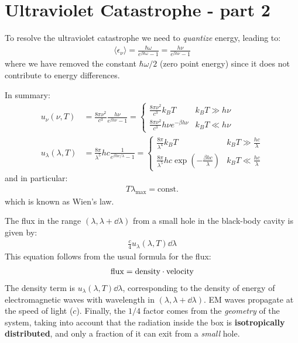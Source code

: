 \documentclass[../../main.tex]{subfiles}
\begin{document}
\section{Ultraviolet Catastrophe - part 2}
To resolve the ultraviolet catastrophe we need to \textit{quantize} energy, leading to:
\begin{align*}
    \langle \epsilon_\nu \rangle = \frac{\hbar \omega}{e^{\beta \hbar \omega} - 1} = \frac{h \nu}{e^{\beta h \nu} - 1}  
\end{align*} 
where we have removed the constant $\hbar \omega/2$ (zero point energy) since it does not contribute to energy differences.

In summary:
\begin{align*}
    u_\nu(\nu, T) &= \frac{8 \pi \nu^2}{c^3} \frac{h \nu}{e^{\beta h \nu} - 1} = \begin{cases}
        \frac{8 \pi \nu^2}{c^3} k_B T & k_B T \gg h \nu\\
        \frac{8 \pi \nu^2}{c^3} h \nu e^{- \beta h \nu} & k_B T \ll h \nu  
    \end{cases}  \\
    u_\lambda(\lambda,T) &= \frac{8 \pi}{\lambda^5} h c \frac{1}{e^{\beta h c/\lambda} - 1} = \begin{cases}
        \frac{8 \pi}{\lambda^4} k_B T & k_B T \gg \frac{hc}{\lambda} \\
        \frac{8 \pi}{\lambda^5} h c \exp\left(-\frac{\beta h c}{\lambda} \right) & k_B T \ll \frac{hc}{\lambda} 
    \end{cases}  
\end{align*}
and in particular:
\begin{align*}
    T \lambda_{\mathrm{max}} = \text{const.}
\end{align*}
which is known as Wien's law.

\medskip

The flux in the range $(\lambda, \lambda + \dd{\lambda})$ from a small hole in the black-body cavity is given by:
\begin{align*}
    \frac{c}{4} u_\lambda (\lambda, T) \dd{\lambda}
\end{align*}
This equation follows from the usual formula for the flux:
\begin{align*}
    \rm{flux} = \rm{density} \cdot \rm{velocity}
\end{align*}
The density term is $u_\lambda(\lambda, T)\dd{\lambda}$, corresponding to the density of energy of electromagnetic waves with wavelength in $(\lambda, \lambda+\dd{\lambda})$. EM waves propagate at the speed of light ($c$). Finally, the $1/4$ factor comes from the \textit{geometry} of the system, taking into account that the radiation inside the box is \textbf{isotropically distributed}, and only a fraction of it can exit from a \textit{small} hole. 
\end{document}
